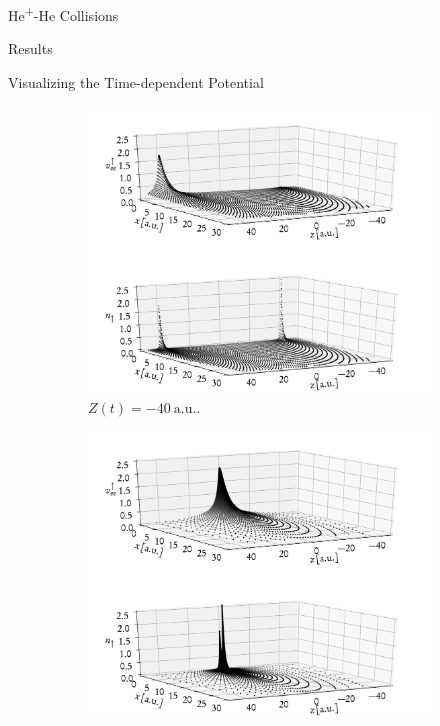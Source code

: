 \documentclass[a5paper, 9 pt]{extreport}
\begin{document}
\begin{chapter}{\texorpdfstring{He\textsuperscript{+}}{He+}-He Collisions \label{chap:hephe}}
\begin{section}{Results \label{sec:hephe-disc}}
\begin{subsection}{Visualizing the Time-dependent Potential \label{sec:visual}}
         \begin{figure}[t]
            \centering
            \begin{subfigure}{.49\textwidth}
               \centering
               \includegraphics[width=\linewidth]{./images/frames/vee-up-E50-b1-initial.pdf}
               \caption{$Z(t) = -40~\mathrm{a.u.}$. \label{fig:upI}}
            \end{subfigure}
            \begin{subfigure}{.49\textwidth}
               \centering
               \includegraphics[width=\linewidth]{./images/frames/vee-up-E50-b1-closest.pdf}

\end{subfigure}
\end{figure}
\end{subsection}
\end{section}
\end{chapter}
\end{document}
